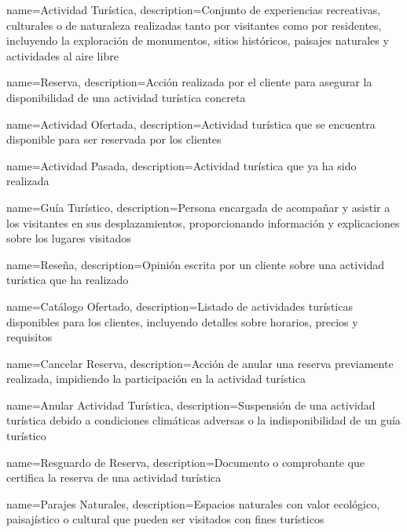 \makeglossaries

{
    name=Actividad Turística,
    description={Conjunto de experiencias recreativas, culturales o de naturaleza realizadas tanto por visitantes como por residentes, incluyendo la exploración de monumentos, sitios históricos, paisajes naturales y actividades al aire libre}
}

{
    name=Reserva,
    description={Acción realizada por el cliente para asegurar la disponibilidad de una actividad turística concreta}
}

{
    name=Actividad Ofertada,
    description={Actividad turística que se encuentra disponible para ser reservada por los clientes}
}

{
    name=Actividad Pasada,
    description={Actividad turística que ya ha sido realizada}
}

{
    name=Guía Turístico,
    description={Persona encargada de acompañar y asistir a los visitantes en sus desplazamientos, proporcionando información y explicaciones sobre los lugares visitados}
}

{
    name=Reseña,
    description={Opinión escrita por un cliente sobre una actividad turística que ha realizado}
}

{
    name=Catálogo Ofertado,
    description={Listado de actividades turísticas disponibles para los clientes, incluyendo detalles sobre horarios, precios y requisitos}
}

{
    name=Cancelar Reserva,
    description={Acción de anular una reserva previamente realizada, impidiendo la participación en la actividad turística}
}

{
    name=Anular Actividad Turística,
    description={Suspensión de una actividad turística debido a condiciones climáticas adversas o la indisponibilidad de un guía turístico}
}

{
    name=Resguardo de Reserva,
    description={Documento o comprobante que certifica la reserva de una actividad turística}
}

{
    name=Parajes Naturales,
    description={Espacios naturales con valor ecológico, paisajístico o cultural que pueden ser visitados con fines turísticos}
}

